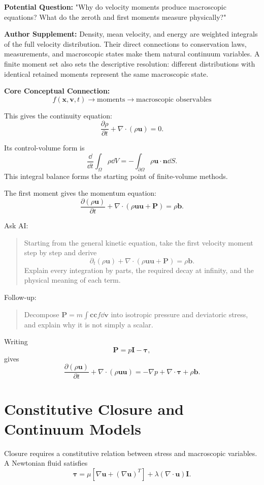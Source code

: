 \begin{authornote}
\textbf{Potential Question:}
"Why do velocity moments produce macroscopic equations? What do the zeroth and first moments measure physically?"

\textbf{Author Supplement:}
Density, mean velocity, and energy are weighted integrals of the full velocity distribution. Their direct connections to conservation laws, measurements, and macroscopic states make them natural continuum variables. A finite moment set also sets the descriptive resolution: different distributions with identical retained moments represent the same macroscopic state.

\textbf{Core Conceptual Connection:}
\[
f(\bm x,\bm v,t)
\longrightarrow
\text{moments}
\longrightarrow
\text{macroscopic observables}
\]
\end{authornote}

This gives the continuity equation:
\[
\boxed{
\frac{\partial\rho}{\partial t}
+\nabla\cdot(\rho\bm u)=0
}.
\]

Its control-volume form is
\[
\frac{\dd}{\dd t}\int_\Omega \rho\dd V
=
-\int_{\partial\Omega}\rho\bm u\cdot\bm n\dd S.
\]
This integral balance forms the starting point of finite-volume methods.

The first moment gives the momentum equation:
\[
\frac{\partial(\rho\bm u)}{\partial t}
+
\nabla\cdot(\rho\bm u\bm u+\bm P)
=
\rho\bm b.
\]

\begin{askai}
Ask AI:
\begin{quote}
Starting from the general kinetic equation, take the first velocity moment step by step and derive
\[
\partial_t(\rho\bm u)+\nabla\cdot(\rho\bm u\bm u+\bm P)=\rho\bm b.
\]
Explain every integration by parts, the required decay at infinity, and the physical meaning of each term.
\end{quote}

Follow-up:
\begin{quote}
Decompose \(\bm P=m\int \bm c\bm c f\dd\bm v\) into isotropic pressure and deviatoric stress, and explain why it is not simply a scalar.
\end{quote}
\end{askai}

Writing
\[
\bm P=p\bm I-\bm\tau,
\]
gives
\[
\frac{\partial(\rho\bm u)}{\partial t}
+
\nabla\cdot(\rho\bm u\bm u)
=
-\nabla p+\nabla\cdot\bm\tau+\rho\bm b.
\]

\section{Constitutive Closure and Continuum Models}
Closure requires a constitutive relation between stress and macroscopic variables. A Newtonian fluid satisfies
\[
\bm\tau
=
\mu\left[\nabla\bm u+(\nabla\bm u)^T\right]
+\lambda(\nabla\cdot\bm u)\bm I.
\]

